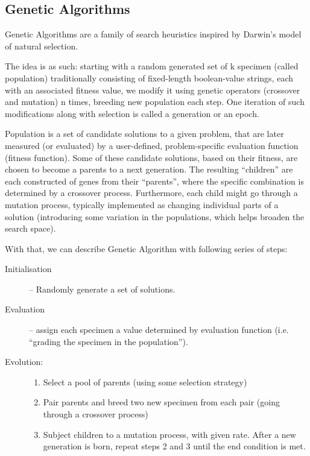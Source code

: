 \subsection{Genetic Algorithms}
Genetic Algorithms are a family of search heuristics inspired by Darwin’s model of natural selection.

The idea is as such: starting with a random generated set of k specimen (called population) traditionally consisting of fixed-length boolean-value strings, each with an associated fitness value, we modify it using genetic operators (crossover and mutation) n times, breeding new population each step. One iteration of such modifications along with selection is called a generation or an epoch.

Population is a set of candidate solutions to a given problem, that are later measured (or evaluated) by a user-defined, problem-specific evaluation function (fitness function). Some of these candidate solutions, based on their fitness, are chosen to become a parents to a next generation. The resulting “children” are each constructed of genes from their “parents”, where the specific combination is determined by a crossover process. Furthermore, each child might go through a mutation process, typically implemented as changing individual parts of a solution (introducing some variation in the populations, which helps broaden the search space).

With that, we can describe Genetic Algorithm with following series of steps:
\begin{description}
    \item[Initialisation] -- Randomly generate a set of solutions.
    \item[Evaluation] -- assign each specimen a value determined by evaluation function (i.e. ``grading the specimen in the population'').
    \item[Evolution:] %
        \begin{enumerate}
            \item Select a pool of parents (using some selection strategy) 
            \item Pair parents and breed two new specimen from each pair (going through a crossover process)
            \item Subject children to a mutation process, with given rate.
                After a new generation is born, repeat steps 2 and 3 until the end condition is met.
        \end{enumerate}
\end{description}

